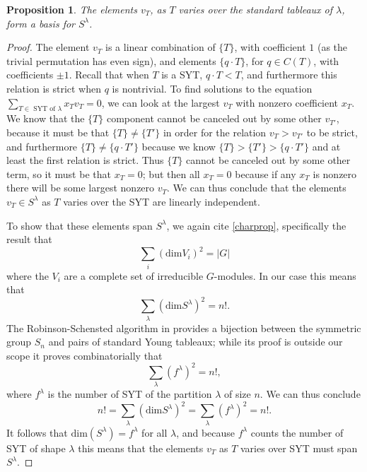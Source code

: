 \documentclass[12pt,twoside]{reedthesis}
\theoremstyle{plain}   %
\newtheorem{prop}{Proposition}[section]
\theoremstyle{definition}
\theoremstyle{remark}
\numberwithin{equation}{section}
\def\dim{\mathrm{dim}}
\begin{document}
  \begin{prop}\label{prop1}
    The elements $v_T$, as $T$ varies over the \emph{standard} tableaux of $\lambda$, form a basis for $S^\lambda$.
  \end{prop}
  \begin{proof}
    The element $v_T$ is a linear combination of $\{T\}$, with coefficient $1$ (as the trivial permutation has even sign),
    and elements $\{q \cdot T\}$, for $q \in C(T)$, with coefficients $\pm 1$.
    Recall that when $T$ is a SYT, $q \cdot T < T$, and furthermore this relation is strict when $q$ is nontrivial.
    To find solutions to the equation $\sum_{T \in \text{ SYT of $\lambda$}} x_Tv_T = 0$,
    we can look at the largest $v_T$ with nonzero coefficient $x_T$.
    We know that the $\{T\}$ component cannot be canceled out by some other $v_{T'}$, because it must be that $\{T\} \neq \{T'\}$ in
    order for the relation $v_T > v_{T'}$ to be strict,
    and furthermore $\{T\} \neq \{q \cdot T'\}$ because we know $\{ T\} > \{T'\} > \{q \cdot T'\}$ and at least the first relation is strict.
    Thus $\{T\}$ cannot be canceled out by some other term, so it must be that $x_T = 0$; but then all $x_T = 0$ because
    if any $x_T$ is nonzero there will be some largest nonzero $v_T$.
    We can thus conclude that the elements $v_T \in S^\lambda$ as $T$ varies over the SYT are linearly independent. \par
    To show that these elements span $S^\lambda$, we again cite \ref{charprop}, specifically the result
    that
    \[ \sum_i (\dim V_i)^2 =|G| \]
    where the $V_i$ are a complete set of irreducible $G$-modules.
    In our case this means that
    \[\sum_\lambda (\dim S^\lambda)^2 = n!.\]
    The Robinson-Schensted algorithm in \cite[Theorem 3.1.1]{sagan} provides a bijection between the symmetric group $S_n$ and pairs of standard Young tableaux;
    while its proof is outside our scope it proves combinatorially that
    \[ \sum_\lambda(f^\lambda)^2 = n!,\]
    where $f^\lambda$ is the number of SYT of the partition $\lambda$ of size $n$.
    We can thus conclude
    \[ n! = \sum_\lambda (\dim S^\lambda)^2 = \sum_\lambda(f^\lambda)^2 = n!.\]
    It follows that $\dim(S^\lambda) = f^\lambda$ for all $\lambda$, and because $f^\lambda$ counts the number of SYT of shape $\lambda$
    this means that the elements $v_T$ as $T$ varies over SYT must span $S^\lambda$.
  \end{proof}
\end{document}
